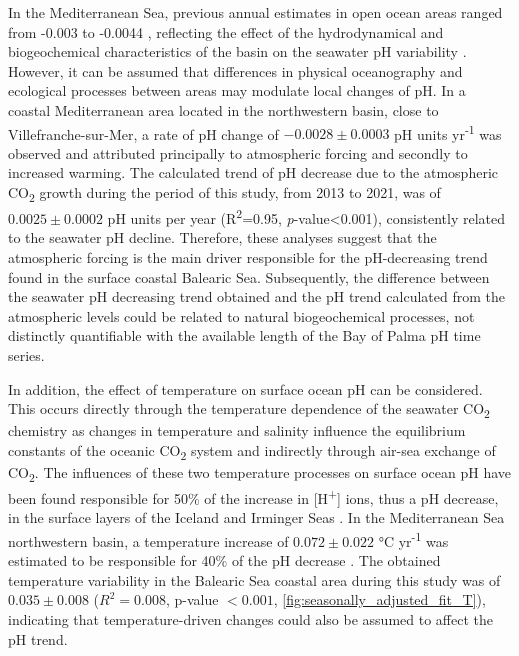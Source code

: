 In the Mediterranean Sea, previous annual estimates in open ocean areas
ranged from -0.003 to -0.0044 \cite{yao2016,Flecha2015}, reflecting the effect
of the hydrodynamical and biogeochemical characteristics of the basin on the
seawater pH variability \cite{lee2011,Palmieri2015,schneider2010}. However, it
can be assumed that differences in physical oceanography and ecological
processes between areas may modulate local changes of pH. In a coastal
Mediterranean area located in the northwestern basin, close to
Villefranche-sur-Mer, a rate of pH change of $-0.0028\pm 0.0003$ pH units
yr\textsuperscript{-1} was observed \cite{Kapsenberg2017} and attributed
principally to atmospheric forcing and secondly to increased warming.
The calculated trend of pH decrease due to the atmospheric
CO\textsubscript{2} growth during the period of this study, from 2013 to 2021,
was of $0.0025\pm 0.0002$ pH units per year (R\textsuperscript{2}=0.95,
\emph{p}-value<0.001), consistently related to the seawater pH decline.
Therefore, these analyses suggest that the atmospheric forcing is the main
driver responsible for the pH-decreasing trend found in the surface
coastal Balearic Sea. Subsequently, the difference between the seawater pH
decreasing trend obtained and the pH trend calculated from the atmospheric
levels could be related to natural biogeochemical processes, not distinctly
quantifiable with the available length of the Bay of Palma pH time series.

In addition, the effect of temperature on surface ocean pH can be considered.
This occurs directly through the temperature dependence of the seawater
CO\textsubscript{2} chemistry as changes in temperature and salinity influence
the equilibrium constants of the oceanic CO\textsubscript{2} system and
indirectly through air-sea exchange of CO\textsubscript{2}. The influences of
these two temperature processes on surface ocean pH have been found responsible
for 50\% of the increase in [H\textsuperscript{+}] ions, thus a pH decrease,
in the surface layers of the Iceland and Irminger Seas
\cite{perez2021contrasting}. In the Mediterranean Sea northwestern basin, a
temperature increase of $0.072\pm 0.022$ °C yr\textsuperscript{-1} was
estimated to be responsible for 40\% of the pH decrease \cite{Kapsenberg2017}.
The obtained temperature variability in the Balearic Sea coastal area during
this study was of $0.035\pm 0.008$ ($R^2=0.008$, p-value $<0.001$,
\cref{fig:seasonally_adjusted_fit_T}), indicating that temperature-driven
changes could also be assumed to affect the pH trend.

